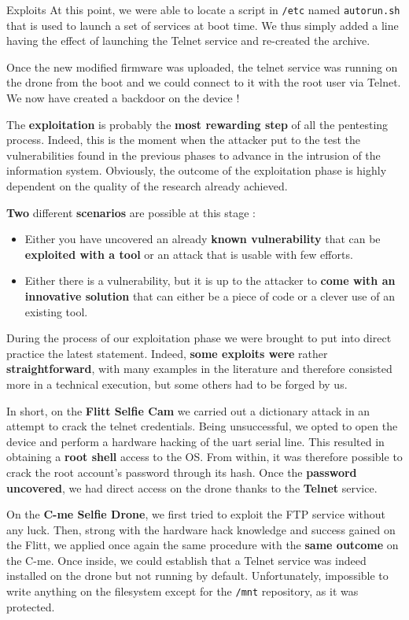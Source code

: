 \begin{chaptercover}{Exploits}
At this point, we were able to locate a script in \texttt{/etc} named \texttt{autorun.sh} that is used to launch a set of services at boot time. We thus simply added a line having the effect of launching the Telnet service and re-created the archive.

Once the new modified firmware was uploaded, the telnet service was running on the drone from the boot and we could connect to it with the root user via Telnet. We now have created a backdoor on the device !

\begin{summary}
The \textbf{exploitation} is probably the \textbf{most rewarding step} of all the pentesting process. Indeed, this is the moment when the attacker put to the test the vulnerabilities found in the previous phases to advance in the intrusion of the information system. Obviously, the outcome of the exploitation phase is highly dependent on the quality of the research already achieved.

\textbf{Two} different \textbf{scenarios} are possible at this stage :
\begin{itemize}
  \item Either you have uncovered an already \textbf{known vulnerability} that can be \textbf{exploited with a tool} or an attack that is usable with few efforts.
  \item Either there is a vulnerability, but it is up to the attacker to \textbf{come with an innovative solution} that can either be a piece of code or a clever use of an existing tool.
\end{itemize}

During the process of our exploitation phase we were brought to put into direct practice the latest statement. Indeed, \textbf{some exploits were} rather \textbf{straightforward}, with many examples in the literature and therefore consisted more in a technical execution, but some others had to be forged by us.

In short, on the \textbf{Flitt Selfie Cam} we carried out a dictionary attack in an attempt to crack the telnet credentials. Being unsuccessful, we opted to open the device and perform a hardware hacking of the \acrshort{uart} serial line. This resulted in obtaining a \textbf{root shell} access to the OS. From within, it was therefore possible to crack the root account’s password through its hash. Once the \textbf{password uncovered}, we had direct access on the drone thanks to the \textbf{Telnet} service.

On the \textbf{C-me Selfie Drone}, we first tried to exploit the FTP service without any luck. Then, strong with the hardware hack knowledge and success gained on the Flitt, we applied once again the same procedure with the \textbf{same outcome} on the C-me. Once inside, we could establish that a Telnet service was indeed installed on the drone but not running by default. Unfortunately, impossible to write anything on the filesystem except for the \texttt{/mnt} repository, as it was protected.


\end{summary}
\end{chaptercover}
